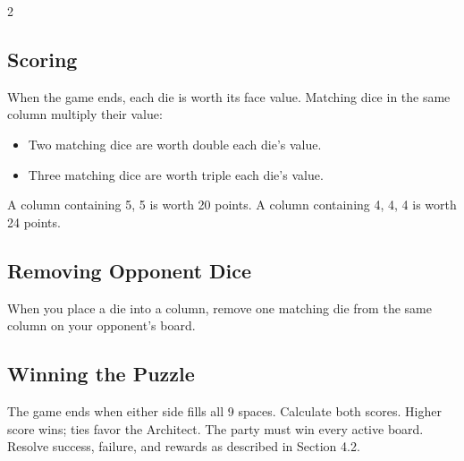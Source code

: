 \begin{multicols}{2}
\begin{center}
\end{center}

\subsection*{Scoring}
When the game ends, each die is worth its face value. Matching dice in the same column multiply their value:
\begin{itemize}
  \item Two matching dice are worth double each die's value.
  \item Three matching dice are worth triple each die's value.
\end{itemize}
A column containing 5, 5 is worth 20 points. A column containing 4, 4, 4 is worth 24 points.

\subsection*{Removing Opponent Dice}
When you place a die into a column, remove one matching die from the same column on your opponent's board.


\subsection*{Winning the Puzzle}
The game ends when either side fills all 9 spaces. Calculate both scores. Higher score wins; ties favor the Architect. The party must win every active board. Resolve success, failure, and rewards as described in Section 4.2.
\end{multicols}

